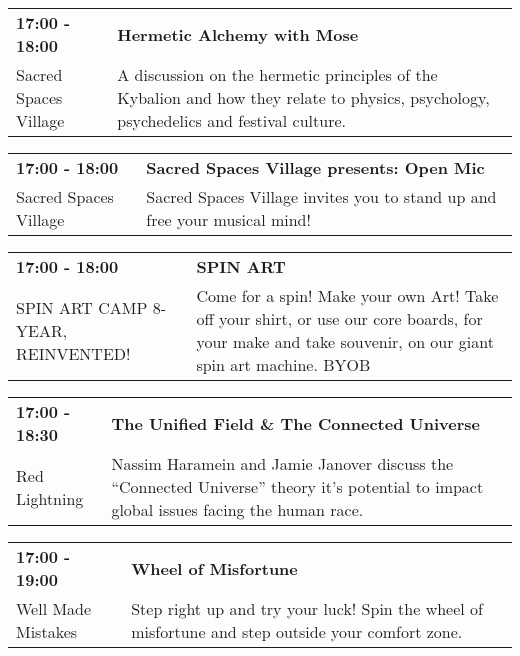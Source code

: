 \begin{tabular}{ p{1in} p{2.2in} }
    \textbf{17:00 - 18:00} & \textbf{Hermetic Alchemy with Mose} \\
    Sacred Spaces Village \newline  & A discussion on the hermetic principles of the Kybalion and how they relate to physics, psychology, psychedelics and festival culture. \\
    \hline 
\end{tabular}
    
\begin{tabular}{ p{1in} p{2.2in} }
    \textbf{17:00 - 18:00} & \textbf{Sacred Spaces Village presents: Open Mic} \\
    Sacred Spaces Village \newline  & Sacred Spaces Village invites you to stand up and free your musical mind! \\
    \hline 
\end{tabular}
    
\begin{tabular}{ p{1in} p{2.2in} }
    \textbf{17:00 - 18:00} & \textbf{SPIN ART} \\
    SPIN ART CAMP 8-YEAR, REINVENTED! \newline  & Come for a spin! Make your own Art! Take off your shirt, or use our core boards, for your make and take souvenir, on our giant spin art machine. BYOB \\
    \hline 
\end{tabular}
    
\begin{tabular}{ p{1in} p{2.2in} }
    \textbf{17:00 - 18:30} & \textbf{The Unified Field \& The Connected Universe} \\
    Red Lightning \newline  & Nassim Haramein and Jamie Janover discuss the ``Connected Universe'' theory it's potential to impact global issues facing the human race. \\
    \hline 
\end{tabular}
    
\begin{tabular}{ p{1in} p{2.2in} }
    \textbf{17:00 - 19:00} & \textbf{Wheel of Misfortune} \\
    Well Made Mistakes \newline  & Step right up and try your luck! Spin the wheel of misfortune and step outside your comfort zone. \\
    \hline 
\end{tabular}
    
